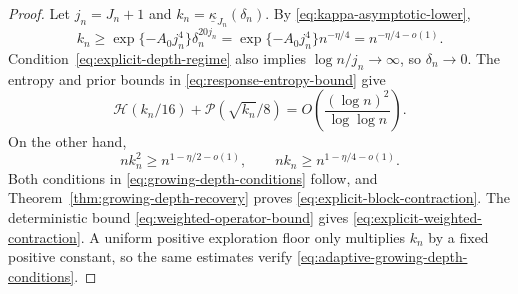 \begin{proof}
Let \(j_n=J_n+1\) and
\(k_n=\underline\kappa_{J_n}(\delta_n)\).  By
\eqref{eq:kappa-asymptotic-lower},
\[
 k_n\ge \exp\{-A_0j_n^4\}\delta_n^{20j_n}
      =\exp\{-A_0j_n^4\}n^{-\eta/4}
      =n^{-\eta/4-o(1)}.
\]
Condition~\eqref{eq:explicit-depth-regime} also implies
\(\log n/j_n\to\infty\), so \(\delta_n\to0\).  The entropy and prior
bounds in \eqref{eq:response-entropy-bound} give
\[
 \mathcal H(k_n/16)+\mathcal P(\sqrt{k_n}/8)
 =O\!\left(\frac{(\log n)^2}{\log\log n}\right).
\]
On the other hand,
\[
 nk_n^2\ge n^{1-\eta/2-o(1)},
 \qquad nk_n\ge n^{1-\eta/4-o(1)}.
\]
Both conditions in \eqref{eq:growing-depth-conditions} follow, and
Theorem~\ref{thm:growing-depth-recovery} proves
\eqref{eq:explicit-block-contraction}.  The deterministic bound
\eqref{eq:weighted-operator-bound} gives
\eqref{eq:explicit-weighted-contraction}.  A uniform positive exploration
floor only multiplies \(k_n\) by a fixed positive constant, so the same
estimates verify \eqref{eq:adaptive-growing-depth-conditions}.
\end{proof}
